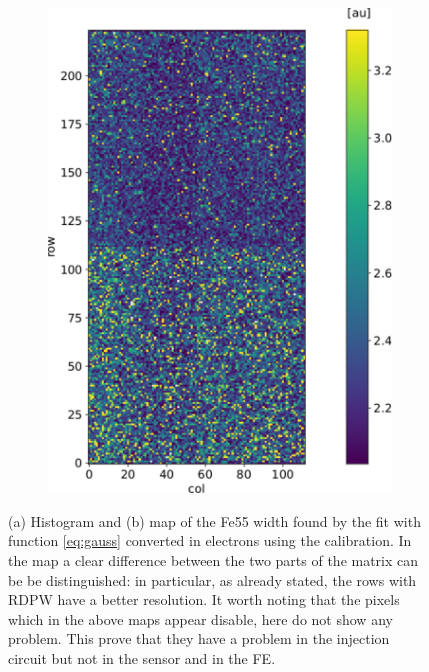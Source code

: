 \begin{figure}
\begin{subfigure}[b]{0.49\textwidth}
                \includegraphics[width=\linewidth]{figures/charaterization/Fe_width_au_map.pdf}   
                \caption{}
                \label{fig:Fe55_width_map}
            \end{subfigure}
            \caption{(a) Histogram and (b) map of the Fe55 width found by the fit with function \ref{eq:gauss} converted in electrons using the calibration. In the map a clear difference between the two parts of the matrix can be be distinguished: in particular, as already stated, the rows with RDPW have a better resolution. It worth noting that the pixels which in the above maps appear disable, here do not show any problem. This prove that they have a problem in the injection circuit but not in the sensor and in the FE.}
            \label{fig:Fe55_resolution}
       \end{figure}  


